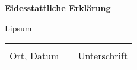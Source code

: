\newpage
\textbf{\Large Eidesstattliche Erklärung}
\vspace{2cm}

Lipsum

\vspace{1cm}

\begin{tabular}{lp{2em}l}
 \hspace{6cm}   && \hspace{6cm} \\\cline{1-1}\cline{3-3}
 Ort, Datum     && Unterschrift
\end{tabular}


\vspace{3cm}
\newpage